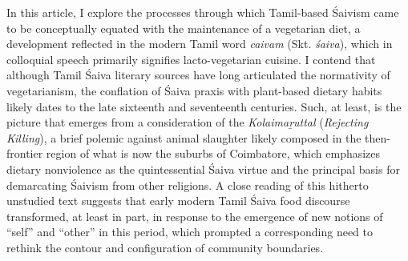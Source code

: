 In this article, I explore the processes through which Tamil-based Śaivism came to be conceptually equated with the maintenance of a vegetarian diet, a development reflected in the modern Tamil word \emph{caivam} (Skt. \emph{śaiva}), which in colloquial speech primarily signifies lacto-vegetarian cuisine. I contend that although Tamil Śaiva literary sources have long articulated the normativity of vegetarianism, the conflation of Śaiva praxis with plant-based dietary habits likely dates to the late sixteenth and seventeenth centuries. Such, at least, is the picture that emerges from a consideration of the \emph{Kolaimaṟuttal} (\emph{Rejecting Killing}), a brief polemic against animal slaughter likely composed in the then-frontier region of what is now the suburbs of Coimbatore, which emphasizes dietary nonviolence as the quintessential Śaiva virtue and the principal basis for demarcating Śaivism from other religions. A close reading of this hitherto unstudied text suggests that early modern Tamil Śaiva food discourse transformed, at least in part, in response to the emergence of new notions of “self” and “other” in this period, which prompted a corresponding need to rethink the contour and configuration of community boundaries.